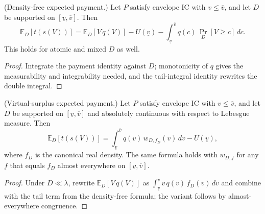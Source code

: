 \begin{theorem}\label{thm:MathEconLib.ValueDistribution.expectedPayment_eq_integral_value_mul_q_sub_integral_tail}\leanok
{}
(Density-free expected payment.) Let $P$ satisfy envelope IC with $\underline v\le\overline v$, and let $D$ be supported on $[\underline v,\overline v]$. Then
\[
\mathbb{E}_D[t(s(V))]=\mathbb{E}_D[V\,q(V)]-U(\underline v)-\int_{\underline v}^{\overline v}q(c)\,\Pr_D[V\ge c]\,dc .
\]
This holds for atomic and mixed $D$ as well.
\end{theorem}
\begin{proof}\leanok
{}
Integrate the payment identity against $D$; monotonicity of $q$ gives the measurability and integrability needed, and the tail-integral identity rewrites the double integral.
\end{proof}

\begin{theorem}\label{thm:MathEconLib.ValueDistribution.expectedPayment_eq_integral_q_mul_virtualSurplusWeight_realDensity}\leanok
{}
(Virtual-surplus expected payment.) Let $P$ satisfy envelope IC with $\underline v\le\overline v$, and let $D$ be supported on $[\underline v,\overline v]$ and absolutely continuous with respect to Lebesgue measure. Then
\[
\mathbb{E}_D[t(s(V))]=\int_{\underline v}^{\overline v}q(v)\,w_{D,f_D}(v)\,dv-U(\underline v),
\]
where $f_D$ is the canonical real density. The same formula holds with $w_{D,f}$ for any $f$ that equals $f_D$ almost everywhere on $[\underline v,\overline v]$.
\end{theorem}
\begin{proof}\leanok
{}
Under $D\ll\lambda$, rewrite $\mathbb{E}_D[V\,q(V)]$ as $\int_{\underline v}^{\overline v}v\,q(v)\,f_D(v)\,dv$ and combine with the tail term from the density-free formula; the variant follows by almost-everywhere congruence.
\end{proof}

